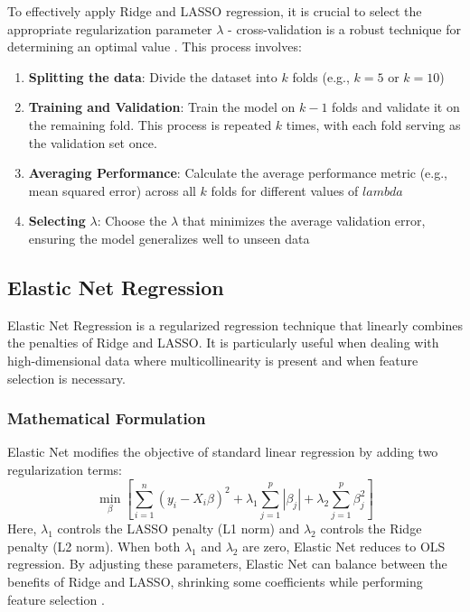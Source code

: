 \documentclass[english,11pt,a4paper,titlepage]{article}
\begin{document}
	To effectively apply Ridge and LASSO regression, it is crucial to select the appropriate regularization parameter \( \lambda \) - cross-validation is a robust technique for determining an optimal value \cite{sohilIntroductionStatisticalLearning2022}. This process involves:
	\begin{enumerate}
		\item \textbf{Splitting the data}: Divide the dataset into \( k \) folds (e.g., \( k = 5 \) or \( k = 10 \))
		\item \textbf{Training and Validation}: Train the model on \( k - 1 \) folds and validate it on the remaining fold. This process is repeated \( k \) times, with each fold serving as the validation set once.
		\item \textbf{Averaging Performance}: Calculate the average performance metric (e.g., mean squared error) across all \( k \) folds for different values of \( lambda \)
		\item \textbf{Selecting} \( \lambda \): Choose the \( \lambda \) that minimizes the average validation error, ensuring the model generalizes well to unseen data
	\end{enumerate}
	
	\subsection*{Elastic Net Regression}
	Elastic Net Regression is a regularized regression technique that linearly combines the penalties of Ridge and LASSO. It is particularly useful when dealing with high-dimensional data where multicollinearity is present and when feature selection is necessary.
	
	\subsubsection*{Mathematical Formulation}
	Elastic Net modifies the objective of standard linear regression by adding two regularization terms:
	\begin{equation}
		\min_\beta \left[\sum_{i=1}^{n}(y_i - X_i\beta)^2 + \lambda_1 \sum_{j=1}^{p}|\beta_{j}| + \lambda_2 \sum_{j=1}^{p}\beta_{j}^{2}\right]
	\end{equation}
	Here, $\lambda_1$ controls the LASSO penalty (L1 norm) and $\lambda_2$ controls the Ridge penalty (L2 norm). When both $\lambda_1$ and $\lambda_2$ are zero, Elastic Net reduces to OLS regression. By adjusting these parameters, Elastic Net can balance between the benefits of Ridge and LASSO, shrinking some coefficients while performing feature selection \cite{zouRegularizationVariableSelection2005}.
	
\end{document}
